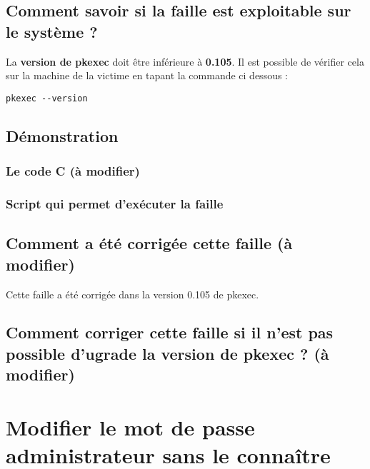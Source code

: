 \documentclass[a4paper, 12pt]{article}
\begin{document}
   		\subsection{Comment savoir si la faille est exploitable sur le système ?}
   		La \textbf{version de pkexec} doit être inférieure à \textbf{0.105}. Il est possible de vérifier cela sur la machine de la victime en tapant la commande ci dessous : 
\begin{lstlisting}
pkexec --version
\end{lstlisting}
   		\subsection{Démonstration}
			\subsubsection{Le code C (à modifier) } 
			  
				
			\subsubsection{Script qui permet d'exécuter la faille}   	
			
		\subsection{Comment a été corrigée cette faille (à modifier)}
		Cette faille a été corrigée dans la version 0.105 de pkexec.
            \subsection{Comment corriger cette faille si il n'est pas possible d'ugrade la version de pkexec ? (à modifier)}

   \section{Modifier le mot de passe administrateur sans le connaître}
        
\end{document}
